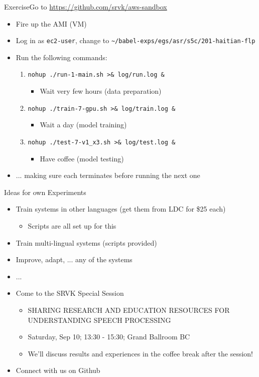 \begin{frame}{Exercise}{Go to \url{https://github.com/srvk/aws-sandbox}}
  \begin{itemize}
  \item Fire up the AMI (VM)
  \item Log in as \texttt{ec2-user}, change to \texttt{\textasciitilde/babel-exps/egs/asr/s5c/201-haitian-flp}
  \item Run the following commands:
    \begin{enumerate}
    \item \texttt{nohup ./run-1-main.sh    >\& log/run.log \&}
      \begin{itemize}
      \item Wait very few hours (data preparation)
      \end{itemize}
    \item \texttt{nohup ./train-7-gpu.sh   >\& log/train.log \&}
      \begin{itemize}
      \item Wait a day (model training)
      \end{itemize}
    \item \texttt{nohup ./test-7-v1\_x3.sh >\& log/test.log \&}
      \begin{itemize}
      \item Have coffee (model testing)
      \end{itemize}
    \end{enumerate}
  \item ... making sure each terminates before running the next one
  \end{itemize}
\end{frame}

\begin{frame}{Ideas for own Experiments}
  \begin{itemize}
  \item Train systems in other languages (get them from LDC for \$25 each)
    \begin{itemize}
    \item Scripts are all set up for this
    \end{itemize}
  \item Train multi-lingual systems (scripts provided)
  \item Improve, adapt, ... any of the systems
  \item ...
  \item Come to the SRVK Special Session
    \begin{itemize}
    \item SHARING RESEARCH AND EDUCATION RESOURCES FOR UNDERSTANDING SPEECH PROCESSING
    \item Saturday, Sep 10; 13:30 - 15:30; Grand Ballroom BC
    \item We'll discuss results and experiences in the coffee break after the session!
    \end{itemize}
  \item {\color{Maroon} Connect with us on Github}
  \end{itemize}
\end{frame}

